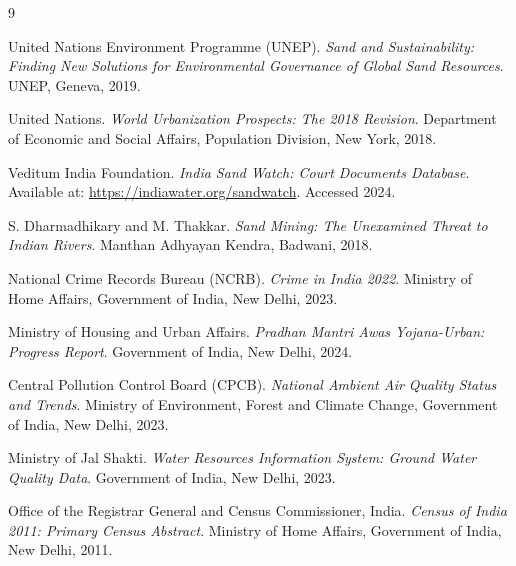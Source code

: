 \documentclass[12pt]{article}
\begin{document}

\begin{thebibliography}{9}

United Nations Environment Programme (UNEP).
\textit{Sand and Sustainability: Finding New Solutions for Environmental Governance of Global Sand Resources}.
UNEP, Geneva, 2019.

United Nations.
\textit{World Urbanization Prospects: The 2018 Revision}.
Department of Economic and Social Affairs, Population Division, New York, 2018.

Veditum India Foundation.
\textit{India Sand Watch: Court Documents Database}.
Available at: \url{https://indiawater.org/sandwatch}. Accessed 2024.

S. Dharmadhikary and M. Thakkar.
\textit{Sand Mining: The Unexamined Threat to Indian Rivers}.
Manthan Adhyayan Kendra, Badwani, 2018.

National Crime Records Bureau (NCRB).
\textit{Crime in India 2022}.
Ministry of Home Affairs, Government of India, New Delhi, 2023.

Ministry of Housing and Urban Affairs.
\textit{Pradhan Mantri Awas Yojana-Urban: Progress Report}.
Government of India, New Delhi, 2024.

Central Pollution Control Board (CPCB).
\textit{National Ambient Air Quality Status and Trends}.
Ministry of Environment, Forest and Climate Change, Government of India, New Delhi, 2023.

Ministry of Jal Shakti.
\textit{Water Resources Information System: Ground Water Quality Data}.
Government of India, New Delhi, 2023.

Office of the Registrar General and Census Commissioner, India.
\textit{Census of India 2011: Primary Census Abstract}.
Ministry of Home Affairs, Government of India, New Delhi, 2011.

\end{thebibliography}
\end{document}
